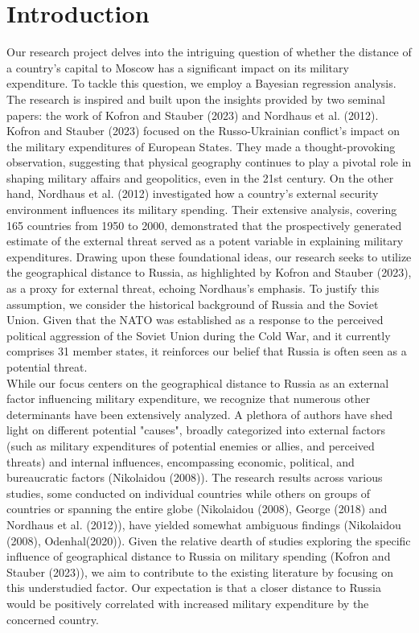 \documentclass[12pt,a4paper]{article}
\begin{document}
\section{Introduction}

Our research project delves into the intriguing question of whether the distance of a country's capital to Moscow has a significant impact on its military expenditure. To tackle this question, we employ a Bayesian regression analysis.\\

The research is inspired and built upon the insights provided by two seminal papers: the work of Kofron and Stauber (2023) and Nordhaus et al. (2012). Kofron and Stauber (2023) focused on the Russo-Ukrainian conflict's impact on the military expenditures of European States. They made a thought-provoking observation, suggesting that physical geography continues to play a pivotal role in shaping military affairs and geopolitics, even in the 21st century. On the other hand, Nordhaus et al. (2012) investigated how a country's external security environment influences its military spending. Their extensive analysis, covering 165 countries from 1950 to 2000, demonstrated that the prospectively generated estimate of the external threat served as a potent variable in explaining military expenditures. Drawing upon these foundational ideas, our research seeks to utilize the geographical distance to Russia, as highlighted by Kofron and Stauber (2023), as a proxy for external threat, echoing Nordhaus's emphasis. To justify this assumption, we consider the historical background of Russia and the Soviet Union. Given that the NATO was established as a response to the perceived political aggression of the Soviet Union during the Cold War, and it currently comprises 31 member states, it reinforces our belief that Russia is often seen as a potential threat.\\

While our focus centers on the geographical distance to Russia as an external factor influencing military expenditure, we recognize that numerous other determinants have been extensively analyzed. A plethora of authors have shed light on different potential "causes", broadly categorized into external factors (such as military expenditures of potential enemies or allies, and perceived threats) and internal influences, encompassing economic, political, and bureaucratic factors (Nikolaidou (2008)). The research results across various studies, some conducted on individual countries while others on groups of countries or spanning the entire globe (Nikolaidou (2008), George (2018) and Nordhaus et al. (2012)), have yielded somewhat ambiguous findings (Nikolaidou (2008), Odenhal(2020)). 
Given the relative dearth of studies exploring the specific influence of geographical distance to Russia on military spending (Kofron and Stauber (2023)), we aim to contribute to the existing literature by focusing on this understudied factor. Our expectation is that a closer distance to Russia would be positively correlated with increased military expenditure by the concerned country. \\ 
\end{document}
